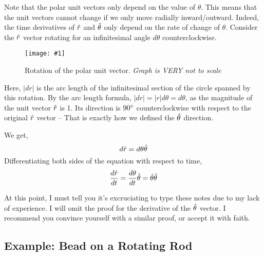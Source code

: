 \documentclass[11pt]{article}
\newcommand{\fig}[4]{
    \begin{figure}[H]
        \centering
        \texttt{[image: \#1]}
        \caption{#2}
        \label{exp4fit}
    \end{figure}
}
\theoremstyle{gangnamstyle}{\newtheorem{definition}{Definition}[]}
\theoremstyle{gangnamstyle}{\newtheorem{example}{Example}[]}
\theoremstyle{gangnamstyle}{\newtheorem{problem}{Problem}[]}
\begin{document}
Note that the polar unit vectors only depend on the value of $\theta$. This means that the unit vectors cannot change if we only move radially inward/outward. Indeed, the time derivatives of $\Hat{r}$ and $\Hat{\theta}$ only depend on the rate of change of $\theta$. Consider the $\Hat{r}$ vector rotating for an infinitesimal angle $d\theta$ counterclockwise. 

\fig{figs/n0/rotate.jpg}{Rotation of the polar unit vector. \textit{Graph is VERY not to scale}}{0.12}{0}

Here, $|dr|$ is the arc length of the infinitesimal section of the circle spanned by this rotation. By the arc length formula, $|dr| = |r| d\theta = d\theta$, as the magnitude of the unit vector $\Hat{r}$ is 1. Its direction is $90\degree$ counterclockwise with respect to the original $\Hat{r}$ vector -- That is exactly how we defined the $\Hat{\theta}$ direction. 

We get, 
\[ d\Hat{r} = d\theta\Hat{\theta} \]
Differentiating both sides of the equation with respect to time, 
\[ \frac{d\Hat{r}}{dt} = \frac{d\theta}{dt}\Hat{\theta} = \Dot{\theta}\Hat{\theta} \]

At this point, I must tell you it's excruciating to type these notes due to my lack of experience. I will omit the proof for the derivative of the $\Hat{\theta}$ vector. I recommend you convince yourself with a similar proof, or accept it with faith. 

\subsection{Example: Bead on a Rotating Rod}
\end{document}

